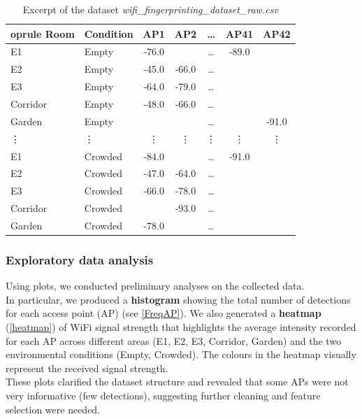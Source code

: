 \documentclass{article}
\begin{document}
\begin{table}[ht!]
    \centering
    \small
    \begin{tabular}{llc c c cc}
        	oprule
        Room & Condition & AP1 & AP2 & \dots & AP41 & AP42 \\
        \midrule
        E1 & Empty & -76.0 &  & \dots & -89.0 & \\

        E2 & Empty & -45.0 & -66.0  & \dots &  & \\
        E3 & Empty & -64.0 & -79.0 & \dots &  &  \\
        Corridor & Empty & -48.0 & -66.0  & \dots &  & \\
        Garden & Empty &  &   & \dots &  & -91.0 \\
         \vdots & \vdots & \vdots & \vdots & \vdots & \vdots & \vdots \\
        E1 & Crowded & -84.0 &  & \dots & -91.0 &  \\
        E2 & Crowded & -47.0 & -64.0  & \dots &  & \\
        E3 & Crowded & -66.0 & -78.0 & \dots &  &  \\
        Corridor & Crowded &  & -93.0  & \dots &  & \\
        Garden & Crowded & -78.0 &   & \dots &  & \\

        \bottomrule
    \end{tabular}
    \caption{Excerpt of the dataset \textit{wifi\_fingerprinting\_dataset\_raw.csv}}
    \label{tab:wifi_data}
\end{table}

\subsubsection{Exploratory data analysis}
Using plots, we conducted preliminary analyses on the collected data.\\
In particular, we produced a \textbf{histogram} showing the total number of detections for each access point (AP) (see \autoref{FreqAP}).
We also generated a \textbf{heatmap} (\autoref{heatmap}) of Wi\-Fi signal strength that highlights the average intensity recorded for each AP across different areas (E1, E2, E3, Corridor, Garden) and the two environmental conditions (Empty, Crowded). The colours in the heatmap visually represent the received signal strength.\\
These plots clarified the dataset structure and revealed that some APs were not very informative (few detections), suggesting further cleaning and feature selection were needed.
\end{document}
